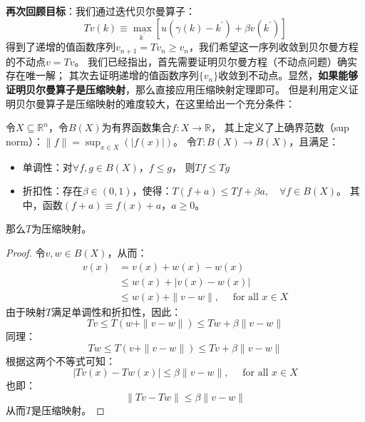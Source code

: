 \textbf{再次回顾目标}：我们通过迭代贝尔曼算子：
\begin{equation*}
    Tv\left(k\right) \equiv \max_{k^{\prime}} 
        \left[u\left(\gamma\left(k\right)-k^{\prime}\right)+\beta v\left(k^{\prime}\right)\right]
\end{equation*}
得到了递增的值函数序列$v_{n+1}=Tv_n \geq v_n$，我们希望这一序列收敛到贝尔曼方程的不动点$v=Tv$。
我们已经指出，首先需要证明贝尔曼方程（不动点问题）确实存在唯一解；
其次去证明递增的值函数序列$\{v_n\}$收敛到不动点。显然，\textbf{如果能够证明贝尔曼算子是压缩映射}，那么直接应用压缩映射定理即可。
但是利用定义证明贝尔曼算子是压缩映射的难度较大，在这里给出一个充分条件：
\begin{theorem}  \label{th-blackwell}
    令$X \subseteq \mathbb{R}^n$，令$B(X)$为有界函数集合$f: X \rightarrow \mathbb{R}$，
    其上定义了上确界范数（sup norm）：$\|f\|=\sup_{x \in X}(|f(x)|)$。
    令$T:B\left(X\right)\rightarrow B\left(X\right)$，且满足：
    \begin{itemize}
        \item 单调性：对$\forall f, g \in B(X)$，$f \leq g$， 则$T f \leq T g$
        \item 折扣性：存在$\beta \in \left(0,1\right)$，使得：$T(f+a) \leq T f+\beta a, \quad \forall f \in B(X)$。
            其中，函数$\left(f+a\right)\equiv f\left(x\right)+a$，$a \geq 0$。
    \end{itemize}
    那么$T$为压缩映射。
\end{theorem}
\begin{proof}
    令$v, w \in B(X)$，从而：
    \begin{equation*}
        \begin{aligned}
            v(x) & =v(x)+w(x)-w(x) \\
            & \leq w(x)+|v(x)-w(x)| \\
            & \leq w(x)+\|v-w\|, \quad \text { for all } x \in X
        \end{aligned}
    \end{equation*}
    由于映射$T$满足单调性和折扣性，因此：
    \begin{equation*}
        T v \leq T(w+\|v-w\|) \leq T w+\beta\|v-w\|
    \end{equation*}
    同理：
    \begin{equation*}
        T w \leq T(v+\|v-w\|) \leq T v+\beta\|v-w\|
    \end{equation*}
    根据这两个不等式可知：
    \begin{equation*}
        |T v(x)-T w(x)| \leq \beta\|v-w\|, \quad \text { for all } x \in X
    \end{equation*}
    也即：
    \begin{equation*}
        \|T v-T w\| \leq \beta\|v-w\|
    \end{equation*}
    从而$T$是压缩映射。
\end{proof}


